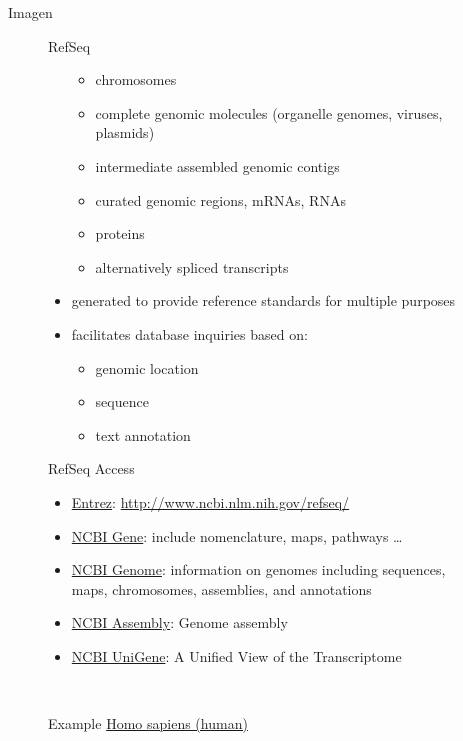 \begin{frame}{Imagen}
\begin{figure}[htbp]
\begin{frame}{RefSeq}
\begin{itemize}
  \begin{itemize}
  \itemsep1pt\parskip0pt
  \item
    chromosomes
  \item
    complete genomic molecules (organelle genomes, viruses, plasmids)
  \item
    intermediate assembled genomic contigs
  \item
    curated genomic regions, mRNAs, RNAs
  \item
    proteins
  \item
    alternatively spliced transcripts
  \end{itemize}
\item
  generated to provide reference standards for multiple purposes
\item
  facilitates database inquiries based on:

  \begin{itemize}
  \itemsep1pt\parskip0pt
  \item
    genomic location
  \item
    sequence
  \item
    text annotation
  \end{itemize}
\end{itemize}

\end{frame}

\begin{frame}{RefSeq Access}

\begin{itemize}
\itemsep1pt\parskip0pt
\item
  \href{http://www.ncbi.nlm.nih.gov/}{Entrez}:
  \url{http://www.ncbi.nlm.nih.gov/refseq/}
\item
  \href{http://www.ncbi.nlm.nih.gov/gene}{NCBI Gene}: include
  nomenclature, maps, pathways \ldots{}
\item
  \href{http://www.ncbi.nlm.nih.gov/genome/}{NCBI Genome}: information
  on genomes including sequences, maps, chromosomes, assemblies, and
  annotations
\item
  \href{http://www.ncbi.nlm.nih.gov/assembly/}{NCBI Assembly}: Genome
  assembly
\item
  \href{http://www.ncbi.nlm.nih.gov/unigene}{NCBI UniGene}: A Unified
  View of the Transcriptome
\end{itemize}

~

Example \href{http://www.ncbi.nlm.nih.gov/genome/51}{Homo sapiens
(human)}


\end{frame}
\end{figure}
\end{frame}
